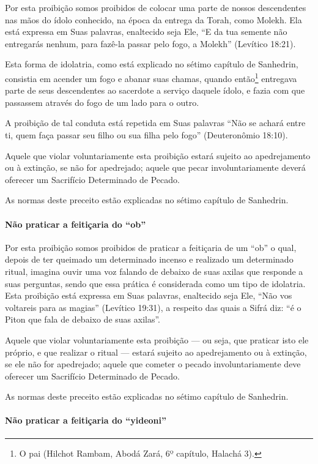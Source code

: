 Por esta proibição somos proibidos de colocar uma parte de nossos
descendentes nas mãos do ídolo conhecido, na época da entrega da Torah,
como Molekh. Ela está expressa em Suas palavras, enaltecido seja Ele,
``E da tua semente não entregarás nenhum, para fazê-la passar pelo fogo,
a Molekh'' (Levítico 18:21).

Esta forma de idolatria, como está explicado no sétimo capítulo de
Sanhedrin, consistia em acender um fogo e abanar suas chamas, quando
então\footnote{O pai (Hilchot Rambam, Abodá Zará, 6º capítulo, Halachá 3).} entregava parte de seus descendentes ao
sacerdote a serviço daquele ídolo, e fazia com que passassem através do
fogo de um lado para o outro.

A proibição de tal conduta está repetida em Suas palavras ``Não se
achará entre ti, quem faça passar seu filho ou sua filha pelo fogo''
(Deuteronômio 18:10).

Aquele que violar voluntariamente esta proibição estará sujeito ao
apedrejamento ou à extinção, se não for apedrejado; aquele que pecar
involuntariamente deverá oferecer um Sacrifício Determinado de Pecado.

As normas deste preceito estão explicadas no sétimo capítulo de Sanhedrin.

\paragraph{Não praticar a feitiçaria do ``ob''}

Por esta proibição somos proibidos de praticar a feitiçaria de um ``ob''
o qual, depois de ter queimado um determinado incenso e realizado um
determinado ritual, imagina ouvir uma voz falando de debaixo de suas
axilas que responde a suas perguntas, sendo que essa prática é considerada como um
tipo de idolatria. Esta proibição está expressa em Suas palavras,
enaltecido seja Ele, ``Não vos voltareis para as magias'' (Levítico
19:31), a respeito das quais a Sifrá diz: ``é o Piton que fala de
debaixo de suas axilas''.

Aquele que violar voluntariamente esta proibição --- ou seja, que
praticar isto ele próprio, e que realizar o ritual --- estará sujeito ao
apedrejamento ou à extinção, se ele não for apedrejado; aquele que
cometer o pecado involuntariamente deve oferecer um Sacrifício
Determinado de Pecado.

As normas deste preceito estão explicadas no sétimo capítulo de Sanhedrin.

\paragraph{Não praticar a feitiçaria do ``yideoni''}

